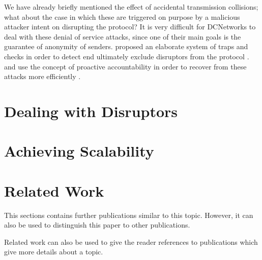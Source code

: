 We have already briefly mentioned the effect of accidental transmission collisions; what about the
case in which these are triggered on purpose by a malicious attacker intent on disrupting the
protocol? It is very difficult for \acp{DCNetwork} to deal with these denial of service attacks,
since one of their main goals is the guarantee of anonymity of senders. \citeauthor{journals/joc/Chaum88}
proposed an elaborate system of traps and checks in order to detect end ultimately exclude
disruptors from the protocol \cite{journals/joc/Chaum88}. \Dissent and \Verdict use the concept of
proactive accountability in order to recover from these attacks more efficiently \cite{journals/corr/abs-1004-3057,corrigan2013proactively}.


\section{Dealing with Disruptors}
\section{Achieving Scalability}

\section{Related Work}

This sections contains further publications similar to this topic. However, it can also be used to distinguish this paper to other publications.

Related work can also be used to give the reader references to publications which give more details about a topic.

